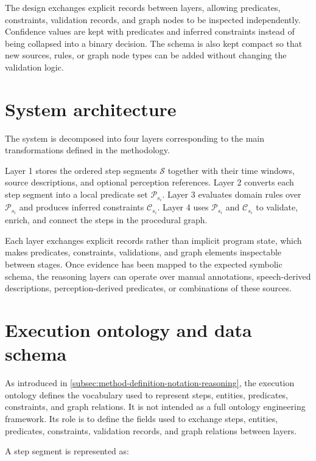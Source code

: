 The design exchanges explicit records between layers, allowing predicates, constraints, validation records, and graph nodes to be inspected independently. Confidence values are kept with predicates and inferred constraints instead of being collapsed into a binary decision. The schema is also kept compact so that new sources, rules, or graph node types can be added without changing the validation logic.

\section{System architecture}
\label{sec:system-architecture}

The system is decomposed into four layers corresponding to the main transformations defined in the methodology.

Layer 1 stores the ordered step segments $\mathcal{S}$ together with their time windows, source descriptions, and optional perception references. Layer 2 converts each step segment into a local predicate set $\mathcal{P}_{s_i}$. Layer 3 evaluates domain rules over $\mathcal{P}_{s_i}$ and produces inferred constraints $\mathcal{C}_{s_i}$. Layer 4 uses $\mathcal{P}_{s_i}$ and $\mathcal{C}_{s_i}$ to validate, enrich, and connect the steps in the procedural graph.

Each layer exchanges explicit records rather than implicit program state, which makes predicates, constraints, validations, and graph elements inspectable between stages. Once evidence has been mapped to the expected symbolic schema, the reasoning layers can operate over manual annotations, speech-derived descriptions, perception-derived predicates, or combinations of these sources.


\section{Execution ontology and data schema}
\label{sec:execution-ontology-schema}

As introduced in \cref{subsec:method-definition-notation-reasoning}, the execution ontology defines the vocabulary used to represent steps, entities, predicates, constraints, and graph relations. It is not intended as a full ontology engineering framework. Its role is to define the fields used to exchange steps, entities, predicates, constraints, validation records, and graph relations between layers.

A step segment is represented as:

